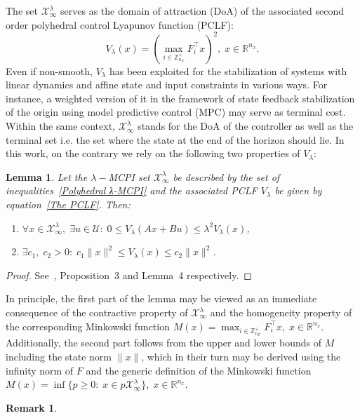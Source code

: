 \documentclass[letterpaper, 10 pt, conference]{ieeeconf}  %
\newtheorem{remark}{Remark}
\newtheorem{lemma}{Lemma}
\begin{document}
The set $\mathcal{X}^{\lambda}_{\infty}$ serves as the domain of attraction (DoA) of the associated second order polyhedral control Lyapunov function (PCLF):
\begin{equation}\label{The PCLF}
V_{\lambda}(x) = \left(\max_{i \in \mathbb{Z}^{+}_{n_{F}}} F^{\top}_{i}x\right)^{2},\; x \in \mathbb{R}^{n_x}.
\end{equation}
Even if non-smooth, $V_{\lambda}$ has been exploited for the stabilization of systems with linear dynamics and affine state and input constraints in various ways. For instance, a weighted version of it in the framework of state feedback stabilization of the origin using model predictive control (MPC) may serve as terminal cost. Within the same context, $\mathcal{X}^{\lambda}_{\infty}$ stands for the DoA of the controller as well as the terminal set i.e. the set where the state at the end of the horizon should lie. In this work, on the contrary we rely on the following two properties of $V_{\lambda}$:
\begin{lemma}\label{PCLF homogeneity and monotonic decrease on DoA}
Let the $\lambda-$MCPI set $\mathcal{X}^{\lambda}_{\infty}$ be described by the set of inequalities~\eqref{Polyhedral λ-MCPI} and the associated PCLF $V_{\lambda}$ be given by equation~\eqref{The PCLF}. Then:
\begin{enumerate}
\renewcommand{\labelenumi}{\roman{enumi})}
\item $\forall x \in \mathcal{X}^{\lambda}_{\infty},\; \exists u \in \mathcal{U}:\; 0 \leq V_{\lambda}(Ax+Bu) \leq \lambda^{2}V_{\lambda}(x)$,
\item $\exists c_{1},\; c_{2} > 0:\; c_{1}\|x\|^{2} \leq V_{\lambda}(x) \leq c_{2}\|x\|^{2}$.
\end{enumerate}
\end{lemma}
\begin{proof}
See~\cite{Grammatico2012PCLF}, Proposition~3 and Lemma~4 respectively.
\end{proof}
In principle, the first part of the lemma may be viewed as an immediate consequence of the contractive property of $\mathcal{X}^{\lambda}_{\infty}$ and the homogeneity property of the corresponding Minkowski function $M(x) = \max_{i \in \mathbb{Z}^{+}_{n_{F}}} F^{\top}_{i}x,\; x \in \mathbb{R}^{n_x}$. Additionally, the second part follows from the upper and lower bounds of $M$ including the state norm $\|x\|$, which in their turn may be derived using the infinity norm of $F$ and the generic definition of the Minkowski function $M(x) = \inf\{p \geq 0:\; x \in p\mathcal{X}^{\lambda}_{\infty}\},\; x \in \mathbb{R}^{n_x}$.
\begin{remark}

\end{remark}
\end{document}
